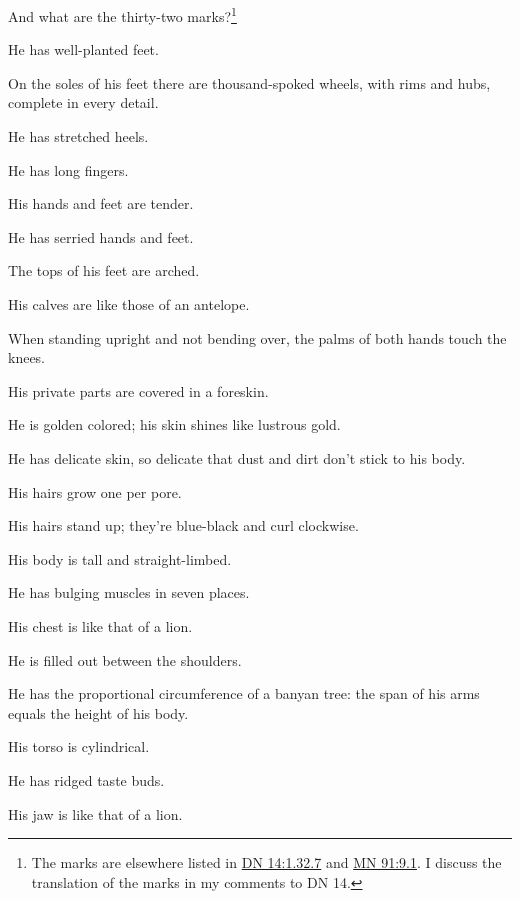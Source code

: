 \documentclass[12pt,openany]{book}%
\begin{document}
And what are the thirty-two marks?\footnote{The marks are elsewhere listed in \href{https://suttacentral.net/dn14/en/sujato\#1.32.7}{DN 14:1.32.7} and \href{https://suttacentral.net/mn91/en/sujato\#9.1}{MN 91:9.1}. I discuss the translation of the marks in my comments to DN 14. } 

He has well-planted feet. 

On the soles of his feet there are thousand-spoked wheels, with rims and hubs, complete in every detail. 

He has stretched heels. 

He has long fingers. 

His hands and feet are tender. 

He has serried hands and feet. 

The tops of his feet are arched. 

His calves are like those of an antelope. 

When standing upright and not bending over, the palms of both hands touch the knees. 

His private parts are covered in a foreskin. 

He is golden colored; his skin shines like lustrous gold. 

He has delicate skin, so delicate that dust and dirt don’t stick to his body. 

His hairs grow one per pore. 

His hairs stand up; they’re blue-black and curl clockwise. 

His body is tall and straight-limbed. 

He has bulging muscles in seven places. 

His chest is like that of a lion. 

He is filled out between the shoulders. 

He has the proportional circumference of a banyan tree: the span of his arms equals the height of his body. 

His torso is cylindrical. 

He has ridged taste buds. 

His jaw is like that of a lion. 
\end{document}
